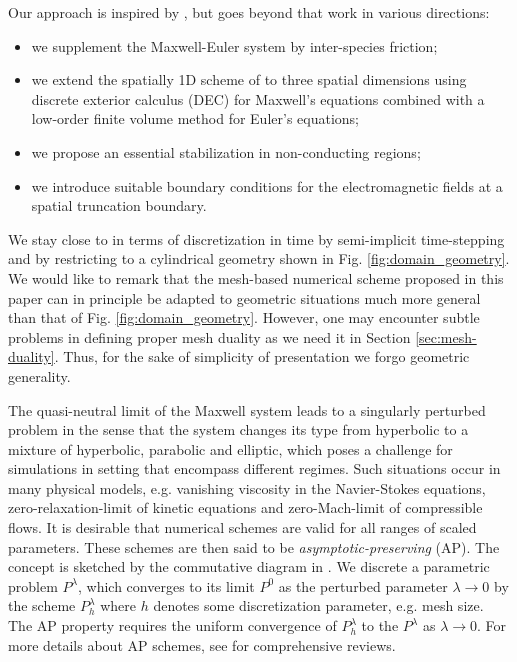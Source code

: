 \documentclass{article}
\begin{document}
Our approach is inspired by \cite{degond_2012}, but goes beyond that work in various directions:
\begin{itemize}
    \item we supplement the Maxwell-Euler system by inter-species friction;
    \item we extend the spatially 1D scheme of \cite{degond_2012} to three spatial dimensions using discrete exterior calculus (DEC) for Maxwell's equations combined with a low-order finite volume method for Euler's equations;
    \item we propose an essential stabilization in non-conducting regions;
    \item we introduce suitable boundary conditions for the electromagnetic fields at a spatial truncation boundary.
\end{itemize}

We stay close to \cite{degond_2012} in terms of discretization in time by semi-implicit time-stepping and by restricting to a cylindrical geometry shown in Fig. \ref{fig:domain_geometry}. We would like to remark that the mesh-based numerical scheme proposed in this paper can in principle be adapted to geometric situations much more general than that of Fig. \ref{fig:domain_geometry}. However, one may encounter subtle problems in defining proper mesh duality as we need it in Section \ref{sec:mesh-duality}. Thus, for the sake of simplicity of presentation we forgo geometric generality.

The quasi-neutral limit of the Maxwell system leads to a singularly perturbed problem in the sense that the system changes its type from hyperbolic to a mixture of hyperbolic, parabolic and elliptic, which poses a challenge for simulations in setting that encompass different regimes. Such situations occur in many physical models, e.g. vanishing viscosity in the Navier-Stokes equations\cite{Kato_1984}, zero-relaxation-limit of kinetic equations\cite{jin_2010} and zero-Mach-limit of compressible flows\cite{degond_2007, haack_2010}. It is desirable that numerical schemes are valid for all ranges of scaled parameters. These schemes are then said to be \emph{asymptotic-preserving} (AP). The concept is sketched by the commutative diagram in \cite{jin_1999}. We discrete a parametric problem $P^\lambda$, which converges to its limit $P^0$ as the perturbed parameter $\lambda \rightarrow 0$ by the scheme $P^\lambda_h$ where $h$ denotes some discretization parameter, e.g. mesh size. The AP property requires the uniform convergence of $P^\lambda_h$ to the $P^\lambda$ as $\lambda\rightarrow0$. For more details about AP schemes, see \cite{jin_2010, degond_2017} for comprehensive reviews.
\end{document}
